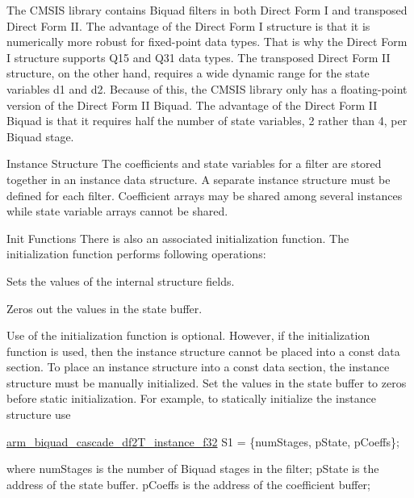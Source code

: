 \begin{DoxyParagraph}{}
The C\-M\-S\-I\-S library contains Biquad filters in both Direct Form I and transposed Direct Form I\-I. The advantage of the Direct Form I structure is that it is numerically more robust for fixed-\/point data types. That is why the Direct Form I structure supports Q15 and Q31 data types. The transposed Direct Form I\-I structure, on the other hand, requires a wide dynamic range for the state variables {\ttfamily d1} and {\ttfamily d2}. Because of this, the C\-M\-S\-I\-S library only has a floating-\/point version of the Direct Form I\-I Biquad. The advantage of the Direct Form I\-I Biquad is that it requires half the number of state variables, 2 rather than 4, per Biquad stage.
\end{DoxyParagraph}
\begin{DoxyParagraph}{Instance Structure }
The coefficients and state variables for a filter are stored together in an instance data structure. A separate instance structure must be defined for each filter. Coefficient arrays may be shared among several instances while state variable arrays cannot be shared.
\end{DoxyParagraph}
\begin{DoxyParagraph}{Init Functions }
There is also an associated initialization function. The initialization function performs following operations\-:
\begin{DoxyItemize}
\item Sets the values of the internal structure fields.
\item Zeros out the values in the state buffer.
\end{DoxyItemize}
\end{DoxyParagraph}
\begin{DoxyParagraph}{}
Use of the initialization function is optional. However, if the initialization function is used, then the instance structure cannot be placed into a const data section. To place an instance structure into a const data section, the instance structure must be manually initialized. Set the values in the state buffer to zeros before static initialization. For example, to statically initialize the instance structure use 
\begin{DoxyPre}       
    \hyperlink{structarm__biquad__cascade__df2_t__instance__f32}{arm\_biquad\_cascade\_df2T\_instance\_f32} S1 = \{numStages, pState, pCoeffs\};       
\end{DoxyPre}
 where {\ttfamily num\-Stages} is the number of Biquad stages in the filter; {\ttfamily p\-State} is the address of the state buffer. {\ttfamily p\-Coeffs} is the address of the coefficient buffer; 
\end{DoxyParagraph}


